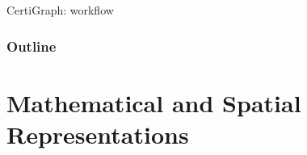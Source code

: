 \documentclass[usenames, xcolor=dvipsnames]{beamer}
\newcommand{\hide}[1]{}
\begin{document}
\begin{frame}{CertiGraph: workflow}
  
\end{frame}

\hide{
\begin{frame}{CertiGraph: pure math graphs}
  \begin{align*}
\Big(\hspace{0.5em}\mathcal{V}& \texttt{: Type}, \\
\mathcal{E}& \texttt{: Type}, \\
\texttt{vvalid}& \texttt{: }\mathcal{V} \rightarrow \texttt{Prop}, \\
\texttt{evalid}& \texttt{: }\mathcal{E} \rightarrow \texttt{Prop}, \\
\texttt{src}& \texttt{: }\mathcal{E} \rightarrow \mathcal{V}, \\
\texttt{dst}& \texttt{: }\mathcal{E} \rightarrow \mathcal{V}, \\
\texttt{vlabel}& \texttt{: }\mathcal{V} \rightarrow \mathcal{L_V}, \\
\texttt{elabel}& \texttt{: }\mathcal{E} \rightarrow \mathcal{L_E}, \\
\texttt{sound}&\texttt{: Type} \hspace{0.5em} \Big)
\end{align*}

\end{frame}
}

\begin{frame}
\frametitle{Outline}
\tableofcontents
\end{frame}

\section{Mathematical and Spatial Representations}
\end{document}
